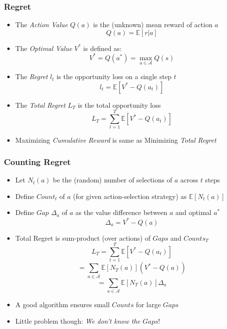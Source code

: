 \documentclass[handout]{beamer}
\begin{document}
\begin{frame}
\frametitle{Regret}
\pause
\begin{itemize}[<+->]
\item The {\em Action Value} $Q(a)$ is the (unknown) mean reward of action $a$
$$Q(a) = \mathbb{E}[r|a]$$
\item The {\em Optimal Value} $V^*$ is defined as:
$$V^* = Q(a^*) = \max_{a\in\mathcal{A}} Q(s)$$
\item The {\em Regret} $l_t$ is the opportunity loss on a single step $t$
$$l_t = \mathbb{E}[V^* - Q(a_t)]$$
\item The {\em Total Regret} $L_T$ is the total opportunity loss
$$L_T = \sum_{t=1}^T \mathbb{E}[V^* - Q(a_t)]$$
\item Maximizing {\em Cumulative Reward} is same as Minimizing {\em Total Regret}
\end{itemize}
\end{frame}

\begin{frame}
\frametitle{Counting Regret}
\pause
\begin{itemize}[<+->]
\item Let $N_t(a)$ be the (random) number of selections of $a$ across $t$ steps
\item Define $Count_t$ of $a$ (for given action-selection strategy) as $\mathbb{E}[N_t(a)]$
\item Define $Gap$ $\Delta_a$ of $a$ as the value difference between $a$ and optimal $a^*$
$$\Delta_a = V^* - Q(a) $$
\item Total Regret is sum-product (over actions) of $Gaps$ and $Counts_T$
$$L_T = \sum_{t=1}^T \mathbb{E}[V^* - Q(a_t)]$$
$$ = \sum_{a\in\mathcal{A}} \mathbb{E}[N_T(a)] (V^* - Q(a))$$
$$ = \sum_{a\in\mathcal{A}} \mathbb{E}[N_T(a)] \Delta_a$$
\item A good algorithm ensures small $Counts$ for large $Gaps$
\item Little problem though: {\em We don't know the $Gaps$}!
\end{itemize}
\end{frame}
\end{document}
